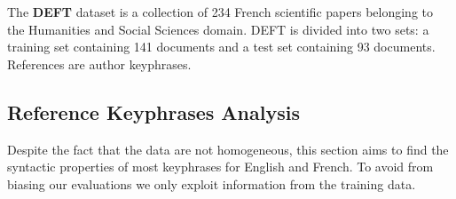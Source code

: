     The \textbf{DEFT} dataset \cite{Paroubek2012deft} is a collection of 234
    French scientific papers belonging to the Humanities and Social Sciences
    domain. DEFT is divided into two sets: a training set containing 141
    documents and a test set containing 93 documents. References are author
    keyphrases.

  \subsection{Reference Keyphrases Analysis}
  \label{subsec:keyphrase_analysis}
    Despite the fact that the data are not homogeneous, this section aims to
    find the syntactic properties of most keyphrases for English and French. To
    avoid from biasing our evaluations we only exploit information from the
    training data.

